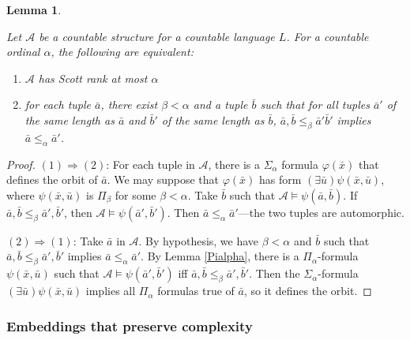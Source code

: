 \documentclass{article}
\newtheorem{lem}[thm]{Lemma}
\begin{document}
\begin{lem}
\label{addedcondition}

Let $\mathcal{A}$ be a countable structure for a countable language $L$.  For a countable ordinal $\alpha$, the following are equivalent:

\begin{enumerate}

\item  $\mathcal{A}$ has Scott rank at most $\alpha$

\item for each tuple $\bar{a}$, there exist $\beta < \alpha$ and a tuple $\bar{b}$ such that for all tuples $\bar{a}'$ of the same length as $\bar{a}$ and $\bar{b}'$ of the same length as $\bar{b}$, $\bar{a},\bar{b}\leq_\beta\bar{a}'\bar{b}'$ implies $\bar{a}\leq_\alpha\bar{a}'$.

\end{enumerate}

\end{lem}

\begin{proof}

$(1)\Rightarrow(2)$:  For each tuple in $\mathcal{A}$, there is a $\Sigma_\alpha$ formula $\varphi(\bar{x})$ that defines the orbit of $\bar{a}$.  We may suppose that $\varphi(\bar{x})$ has form $(\exists\bar{u})\psi(\bar{x},\bar{u})$, where $\psi(\bar{x},\bar{u})$ is $\Pi_\beta$ for some $\beta < \alpha$.  Take $\bar{b}$ such that $\mathcal{A}\models\psi(\bar{a},\bar{b})$.  If $\bar{a},\bar{b}\leq_\beta\bar{a}',\bar{b}'$, then $\mathcal{A}\models\psi(\bar{a}',\bar{b}')$.  Then $\bar{a}\leq_\alpha\bar{a}'$---the two tuples are automorphic.    

$(2)\Rightarrow(1)$:  Take $\bar{a}$ in $\mathcal{A}$.  By hypothesis, we have $\beta < \alpha$ and $\bar{b}$ such that $\bar{a},\bar{b}\leq_\beta \bar{a}',\bar{b}'$ implies $\bar{a}\leq_\alpha\bar{a}'$.  By Lemma \ref{Pialpha}, there is a $\Pi_\alpha$-formula $\psi(\bar{x},\bar{u})$ such that $\mathcal{A}\models\psi(\bar{a}',\bar{b}')$ iff $\bar{a},\bar{b}\leq_\beta\bar{a}',\bar{b}'$.  Then the $\Sigma_\alpha$-formula $(\exists\bar{u})\psi(\bar{x},\bar{u})$ implies all $\Pi_\alpha$ formulas true of $\bar{a}$, so it defines the orbit.      
\end{proof}

\subsubsection{Embeddings that preserve complexity}
\end{document}
